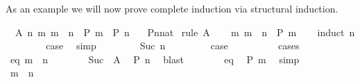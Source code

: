 \begin{isabellebody}
\begin{isamarkuptext}
As an example we will now prove complete induction via
structural induction.%
\end{isamarkuptext}%
\isamarkuptrue%
\isamarkupfalse%
\ \ A{\isacharcolon}\ {\isachardoublequoteopen}{\isacharparenleft}{\isasymAnd}n{\isachardot}\ {\isacharparenleft}{\isasymAnd}m{\isachardot}\ m\ {\isacharless}\ n\ {\isasymLongrightarrow}\ P\ m{\isacharparenright}\ {\isasymLongrightarrow}\ P\ n{\isacharparenright}{\isachardoublequoteclose}\isanewline
\ \ \ {\isachardoublequoteopen}P{\isacharparenleft}n{\isacharcolon}{\isacharcolon}nat{\isacharparenright}{\isachardoublequoteclose}\isanewline
%
\isadelimproof
%
\endisadelimproof
%
\isatagproof
{}\isamarkupfalse%
\ {\isacharparenleft}rule\ A{\isacharparenright}\isanewline
\ \ \isamarkupfalse%
\ {\isachardoublequoteopen}{\isasymAnd}m{\isachardot}\ m\ {\isacharless}\ n\ {\isasymLongrightarrow}\ P\ m{\isachardoublequoteclose}\isanewline
\ \ \isamarkupfalse%
\ {\isacharparenleft}induct\ n{\isacharparenright}\isanewline
\ \ \ \ \isamarkupfalse%
\ {}\ \isamarkupfalse%
\ {\isacharquery}case\ \isamarkupfalse%
\ simp\isanewline
\ \ \isamarkupfalse%
\isanewline
\ \ \ \ \isamarkupfalse%
\ {\isacharparenleft}Suc\ n{\isacharparenright}\ \ \ %
\isanewline
\ \ \ \ \isamarkupfalse%
\ {\isacharquery}case\ \ \ \ %
\isanewline
\ \ \ \ \isamarkupfalse%
\ cases\isanewline
\ \ \ \ \ \ \isamarkupfalse%
\ eq{\isacharcolon}\ {\isachardoublequoteopen}m\ {\isacharequal}\ n{\isachardoublequoteclose}\isanewline
\ \ \ \ \ \ \isamarkupfalse%
\ Suc\ \ A\ \isamarkupfalse%
\ {\isachardoublequoteopen}P\ n{\isachardoublequoteclose}\ \isamarkupfalse%
\ blast\isanewline
\ \ \ \ \ \ \isamarkupfalse%
\ eq\ \isamarkupfalse%
\ {\isachardoublequoteopen}P\ m{\isachardoublequoteclose}\ \isamarkupfalse%
\ simp\isanewline
\ \ \ \ \isamarkupfalse%
\isanewline
\ \ \ \ \ \ \isamarkupfalse%
\ {\isachardoublequoteopen}m\ {\isasymnoteq}\ n{\isachardoublequoteclose}\isanewline

\end{isabellebody}
